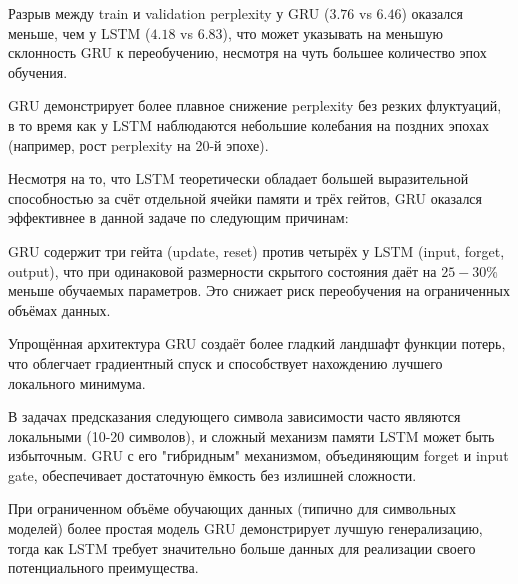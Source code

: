 Разрыв между train и validation perplexity у GRU ($3.76$ vs $6.46$) оказался меньше, чем у LSTM ($4.18$ vs $6.83$), что может указывать на меньшую склонность GRU к переобучению, несмотря на чуть большее количество эпох обучения.

GRU демонстрирует более плавное снижение perplexity без резких флуктуаций, в то время как у LSTM наблюдаются небольшие колебания на поздних эпохах (например, рост perplexity на 20-й эпохе).

Несмотря на то, что LSTM теоретически обладает большей выразительной способностью за счёт отдельной ячейки памяти и трёх гейтов, GRU оказался эффективнее в данной задаче по следующим причинам:

GRU содержит три гейта (update, reset) против четырёх у LSTM (input, forget, output), что при одинаковой размерности скрытого состояния даёт на $25-30\%$ меньше обучаемых параметров. Это снижает риск переобучения на ограниченных объёмах данных.

Упрощённая архитектура GRU создаёт более гладкий ландшафт функции потерь, что облегчает градиентный спуск и способствует нахождению лучшего локального минимума.

В задачах предсказания следующего символа зависимости часто являются локальными (10-20 символов), и сложный механизм памяти LSTM может быть избыточным. GRU с его "гибридным" механизмом, объединяющим forget и input gate, обеспечивает достаточную ёмкость без излишней сложности.

При ограниченном объёме обучающих данных (типично для символьных моделей) более простая модель GRU демонстрирует лучшую генерализацию, тогда как LSTM требует значительно больше данных для реализации своего потенциального преимущества.


